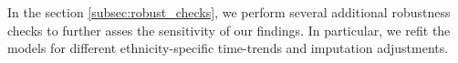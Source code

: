 

In the section \ref{subsec:robust_checks}, we perform several additional robustness checks to further asses the sensitivity of our findings. In particular, we refit the models for different ethnicity-specific time-trends and imputation adjustments. 

 


